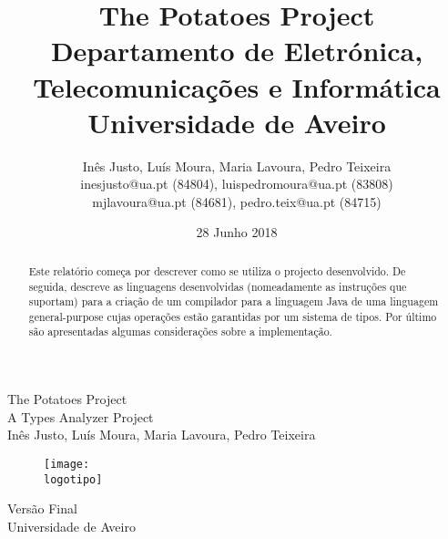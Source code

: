 \documentclass{report}
\begin{document}
%
\def\titulo{The Potatoes Project}
\def\subtitulo{A Types Analyzer Project}
\def\data{28 Junho 2018}
\def\autores{Inês Justo, Luís Moura, Maria Lavoura, Pedro Teixeira}
\def\autorescontactos{inesjusto@ua.pt (84804), luispedromoura@ua.pt (83808)}
\def\autorescontactoss{mjlavoura@ua.pt (84681), pedro.teix@ua.pt (84715)}
\def\versao{Versão Final}
\def\departamento{Departamento de Eletrónica, Telecomunicações e Informática}
\def\empresa{Universidade de Aveiro}
\def\logotipo{images/ua.pdf}
%
%
\begin{titlepage}

\begin{center}
%
\vspace*{50mm}
%
{\Huge \titulo}\\ 
%
\vspace{10mm}
%
{\Large \subtitulo}\\
%
\vspace{10mm}
%
{\LARGE \autores}\\ 
%
\vspace{30mm}
%
\begin{figure}[h]
\center
\texttt{[image: \\logotipo]}
\end{figure}
%
\vspace{30mm}
\end{center}
%
\begin{flushright}
\versao\\
\empresa
\end{flushright}
\end{titlepage}

\title{%
{\Huge\textbf{\titulo}}\\
{\Large \departamento\\ \empresa}
}
%
\author{%
    \autores \\
    \autorescontactos \\
    \autorescontactoss
}
%
\date{\data}
%
\maketitle
{}

\begin{abstract}
Este relatório começa por descrever como se utiliza o projecto desenvolvido. De seguida, descreve as linguagens desenvolvidas (nomeadamente as instruções que suportam) para a criação de um compilador para a linguagem Java de uma linguagem general-purpose cujas operações estão garantidas por um sistema de tipos. Por último são apresentadas algumas considerações sobre a implementação.
\end{abstract}
\end{document}
